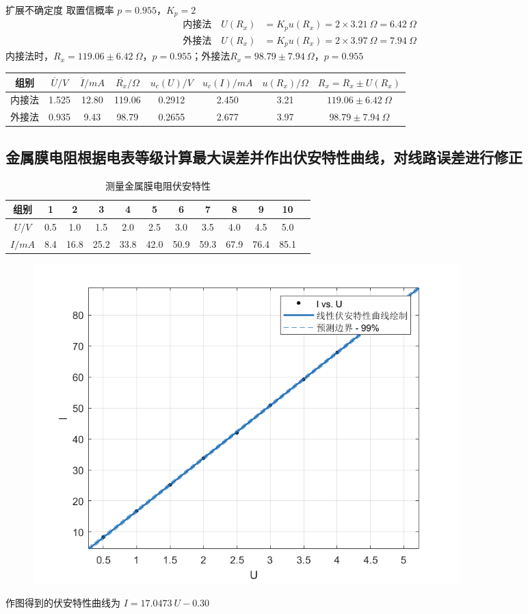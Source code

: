 \documentclass[UTF8]{ctexart}
\begin{document}
扩展不确定度 取置信概率 $p = 0.955$，$K_p = 2$
\begin{align*}
  \text{内接法}  \quad U(R_x) &= K_p u(R_x) = 2 \times 3.21 \ \Omega = 6.42 \ \Omega \\
  \text{外接法}  \quad U(R_x) &= K_p u(R_x) = 2 \times 3.97 \ \Omega = 7.94 \ \Omega 
\end{align*}
内接法时，$R_x =  119.06 \pm 6.42\  \Omega$，$p=0.955$；外接法$R_x = 98.79 \pm 7.94 \ \Omega$，$p = 0.955$
\begin{table}[H]
    \centering
    \begin{tabular}{c|c|c|c|c|c|c|c}
    \toprule
         组别 &  $\overline{U}/V$ & $\overline{I}/mA$ & $\overline{R_x}/\Omega$ & $u_c(U)/V$ & $u_c(I)/mA$ &  $u(R_x)/\Omega$  & $R_x = R_x \pm U(R_x)$\\
    \midrule
         内接法 & 1.525 &  12.80  &  119.06  &  0.2912 & 2.450  & 3.21  & $119.06 \pm 6.42\  \Omega$ \\
    \midrule
         外接法 & 0.935 &  9.43   &  98.79   &  0.2655 & 2.677  & 3.97  & $98.79 \pm 7.94 \ \Omega$\\
    \bottomrule
    \end{tabular}
\end{table}

\subsection{金属膜电阻根据电表等级计算最大误差并作出伏安特性曲线，对线路误差进行修正}
\begin{table}[H]
    \centering
    \caption*{测量金属膜电阻伏安特性}
    \begin{tabular}{|c|c|c|c|c|c|c|c|c|c|c|c|}
    \hline
      组别   & 1 & 2 & 3 & 4 & 5 & 6 & 7 & 8 & 9 & 10 \\
    \hline
       $U/V$  & 0.5  &  1.0  &  1.5  &   2.0  &  2.5  &  3.0  & 3.5  &  4.0  & 4.5  & 5.0           \\
    \hline
       $I/mA$ &  8.4  &   16.8  &  25.2  &   33.8   &   42.0   &   50.9  &  59.3  &  67.9  &  76.4  &  85.1  \\
    \hline
    \end{tabular}
\end{table}
\begin{figure}[H]  %
		\centering
		\includegraphics[width=0.8\textwidth,height=0.5\textwidth]{img/金属膜伏安特性曲线.png}
		\label{fig:side:b} 
\end{figure}
作图得到的伏安特性曲线为 $I = 17.0473 \ U - 0.30$
\end{document}
